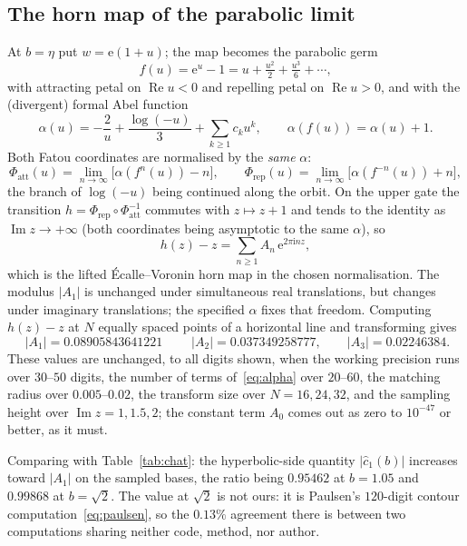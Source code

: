 \documentclass[11pt,a4paper]{article}
\theoremstyle{definition}
\newcommand{\eee}{\mathrm{e}}
\newcommand{\ii}{\mathrm{i}}
\newcommand{\chat}{\hat{c}_1}
\begin{document}
\subsection{The horn map of the parabolic limit}\label{sec:horn}

At $b=\eta$ put $w=\eee(1+u)$; the map becomes the parabolic germ
\begin{equation}\label{eq:germ}
  f(u)=\eee^{u}-1=u+\tfrac{u^{2}}{2}+\tfrac{u^{3}}{6}+\cdots,
\end{equation}
with attracting petal on $\operatorname{Re}u<0$ and repelling petal on
$\operatorname{Re}u>0$, and with the (divergent) formal Abel function
\begin{equation}\label{eq:alpha}
  \alpha(u)=-\frac{2}{u}+\frac{\log(-u)}{3}+\sum_{k\ge1}c_ku^{k},
  \qquad \alpha(f(u))=\alpha(u)+1 .
\end{equation}
Both Fatou coordinates are normalised by the \emph{same} $\alpha$:
\[
  \Phi_{\mathrm{att}}(u)=\lim_{n\to\infty}\bigl[\alpha(f^{n}(u))-n\bigr],
  \qquad
  \Phi_{\mathrm{rep}}(u)=\lim_{n\to\infty}\bigl[\alpha(f^{-n}(u))+n\bigr],
\]
the branch of $\log(-u)$ being continued along the orbit.  On the upper gate the
transition $h=\Phi_{\mathrm{rep}}\circ\Phi_{\mathrm{att}}^{-1}$ commutes with
$z\mapsto z+1$ and tends to the identity as $\operatorname{Im}z\to+\infty$
(both coordinates being asymptotic to the same $\alpha$), so
\begin{equation}\label{eq:horn}
  h(z)-z=\sum_{n\ge1}A_n\,\eee^{2\pi\ii nz},
\end{equation}
which is the lifted \'Ecalle--Voronin horn map in the chosen normalisation.
The modulus $|A_1|$ is unchanged under simultaneous real translations, but
changes under imaginary translations; the specified $\alpha$ fixes that freedom.  Computing
$h(z)-z$ at $N$ equally spaced points of a horizontal line and transforming
gives
\begin{equation}\label{eq:A1}
  \boxed{\;|A_1|=0.08905843641221\;}\qquad |A_2|=0.037349258777,\qquad
  |A_3|=0.02246384 .
\end{equation}
These values are unchanged, to all digits shown, when the working precision runs
over $30$--$50$ digits, the number of terms of~\eqref{eq:alpha} over $20$--$60$,
the matching radius over $0.005$--$0.02$, the transform size over $N=16,24,32$,
and the sampling height over $\operatorname{Im}z=1,1.5,2$; the constant term
$A_0$ comes out as zero to $10^{-47}$ or better, as it must.

Comparing with Table~\ref{tab:chat}: the hyperbolic-side quantity $|\chat(b)|$
increases toward $|A_1|$ on the sampled bases, the ratio being $0.95462$ at
$b=1.05$ and $0.99868$ at $b=\sqrt2$.  The value at $\sqrt2$ is not ours: it is
Paulsen's $120$-digit contour computation~\eqref{eq:paulsen}, so the $0.13\%$
agreement there is between two computations sharing neither code, method, nor
author.
\end{document}
